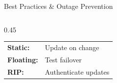 \documentclass[aspectratio=169]{beamer}
\begin{document}
\begin{frame}{Best Practices \& Outage Prevention}
\begin{columns}[T,onlytextwidth]
\begin{column}{0.45\textwidth}

\vspace{2mm}
\footnotesize
\begin{tabular}{@{}>{\bfseries}l l@{}}
Static:   & Update on change \\
Floating: & Test failover \\
RIP:      & Authenticate updates \\
\end{tabular}
\end{column}

\end{columns}
\end{frame}
\end{document}
